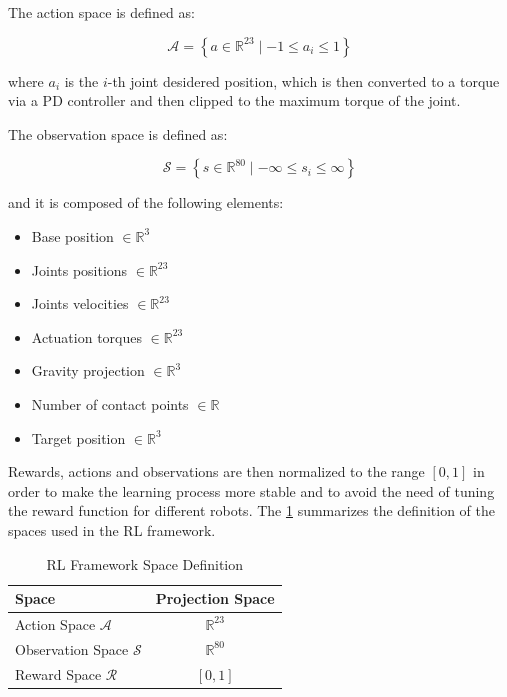 The action space is defined as:

\begin{equation}
    \mathcal{A} = \left\{ a \in \mathbb{R} ^{23} \mid -1 \leq a_i \leq 1 \right\}
\end{equation}

where $a_i$ is the $i$-th joint desidered position, which is then converted to a torque via a PD controller and then clipped to the maximum torque of the joint.

The observation space is defined as:

\begin{equation}
    \mathcal{S} = \left\{ s \in \mathbb{R} ^{80} \mid -\infty \leq s_i \leq \infty \right\}
\end{equation}

and it is composed of the following elements:

\begin{itemize}
    \item Base position $\in \mathbb{R} ^{3}$
    \item Joints positions $\in \mathbb{R} ^{23}$
    \item Joints velocities $\in \mathbb{R} ^{23}$
    \item Actuation torques $\in \mathbb{R} ^{23}$
    \item Gravity projection $\in \mathbb{R} ^{3}$
    \item Number of contact points $\in \mathbb{R}$
    \item Target position $\in \mathbb{R} ^{3}$
\end{itemize}

Rewards, actions and observations are then normalized to the range $[0,1]$ in order to make the learning process more stable and to avoid the need of tuning the reward function for different robots. The \cref{tab:rlspacedef} summarizes the definition of the spaces used in the \ac{RL} framework.

\begin{table}
    \centering
    \begin{tabular}{l c}
        \toprule
        Space                           & Projection Space   \\
        \midrule
        Action Space $\mathcal{A}$      & $\mathbb{R} ^{23}$ \\
        Observation Space $\mathcal{S}$ & $\mathbb{R} ^{80}$ \\
        Reward Space $\mathcal{R}$      & $[0,1]$            \\
        \bottomrule
    \end{tabular}
    \caption{RL Framework Space Definition}
    \label{tab:rlspacedef}
\end{table}

